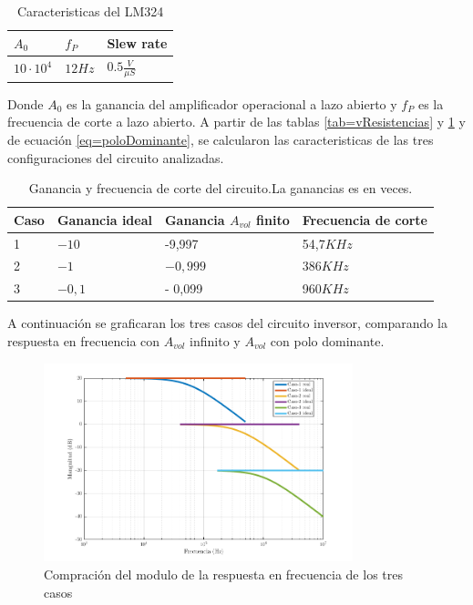 \documentclass[../../main.tex]{subfiles}
\begin{document}
\begin{table}[h]
\begin{center}
\begin{tabular}{|l|l|l|}
\hline
$A_{0}$ & $f_{P}$ & Slew rate \\
\hline \hline
$10\cdot 10^{4}$& $ 12Hz $ & $0.5 \frac{V}{\mu S}$\\ \hline

\end{tabular}
\caption{Caracteristicas del LM324} 
\label{tab=lm324Carac}
\end{center}
\end{table}
Donde $A_{0}$ es la ganancia del amplificador operacional a lazo abierto y  $f_{P}$ es la frecuencia de corte a lazo abierto. A partir de las tablas \ref{tab=vResistencias} y \ref{tab=lm324Carac} y de ecuación  \ref{eq=poloDominante}, se calcularon las caracteristicas de las tres configuraciones del circuito analizadas.

\begin{table}[h]
\begin{center}
\begin{tabular}{|l|l|l|l|}
\hline
Caso &Ganancia ideal & Ganancia $A_{vol}$ finito & Frecuencia de corte\\
\hline \hline
1 & $-10$ & -9,997 & 54,7$KHz$ \\ \hline
2 & $-1$ &  $-0,999 $ &  386$KHz$  \\ \hline
3 & $-0,1$ &- 0,099 &960$KHz$\\ \hline
\end{tabular}
\caption{Ganancia y frecuencia de corte del circuito.La ganancias es en veces.} 
\label{tab=gananciayFrecCorte}
\end{center}
\end{table}

A continuación se graficaran los tres casos del circuito inversor, comparando la respuesta en frecuencia con $A_{vol}$ infinito y $A_{vol}$ con polo dominante.

\begin{figure}[H]
\centering
\includegraphics[width=0.8\textwidth]{imagenes/real_ideal_mag_inv.png}
\caption{Compración del modulo de la respuesta en frecuencia de los tres casos}
\end{figure}
\end{document}
